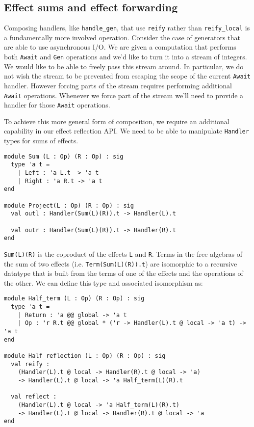 \documentclass[acmsmall, screen, nonacm]{acmart}
\theoremstyle{definition}
\begin{document}
\subsection{Effect sums and effect forwarding}

Composing handlers, like \lstinline[style=oxcaml]{handle_gen}, that use
\lstinline[style=oxcaml]{reify} rather than
\lstinline[style=oxcaml]{reify_local} is a fundamentally more involved
operation. Consider the case of generators that are able to use
asynchronous I/O. We are given a computation that performs both
\lstinline[style=oxcaml]{Await} and \lstinline[style=oxcaml]{Gen}
operations and we'd like to turn it into a stream of integers.  We would
like to be able to freely pass this stream around. In particular, we do
not wish the stream to be prevented from escaping the scope of the
current \lstinline[style=oxcaml]{Await} handler.  However forcing parts
of the stream requires performing additional
\lstinline[style=oxcaml]{Await} operations. Whenever we force part of the
stream we'll need to provide a handler for those
\lstinline[style=oxcaml]{Await} operations.

To achieve this more general form of composition, we require an
additional capability in our effect reflection API. We need to be able
to manipulate \lstinline[style=oxcaml]{Handler} types for sums of
effects.
\begin{lstlisting}[style=oxcaml]
module Sum (L : Op) (R : Op) : sig
  type 'a t =
    | Left : 'a L.t -> 'a t
    | Right : 'a R.t -> 'a t
end

module Project(L : Op) (R : Op) : sig
  val outl : Handler(Sum(L)(R)).t -> Handler(L).t

  val outr : Handler(Sum(L)(R)).t -> Handler(R).t
end
\end{lstlisting}

\lstinline[style=oxcaml]{Sum(L)(R)} is the coproduct of the effects
\lstinline[style=oxcaml]{L} and \lstinline[style=oxcaml]{R}. Terms in
the free algebras of the sum of two effects
(i.e. \lstinline[style=oxcaml]{Term(Sum(L)(R)).t}) are isomorphic to a
recursive datatype that is built from the terms of one of the effects
and the operations of the other\cite{hyland2006combining}. We can define
this type and associated isomorphism as:
\begin{lstlisting}[style=oxcaml]
module Half_term (L : Op) (R : Op) : sig
  type 'a t =
    | Return : 'a @@ global -> 'a t
    | Op : 'r R.t @@ global * ('r -> Handler(L).t @ local -> 'a t) -> 'a t
end

module Half_reflection (L : Op) (R : Op) : sig
  val reify :
    (Handler(L).t @ local -> Handler(R).t @ local -> 'a)
    -> Handler(L).t @ local -> 'a Half_term(L)(R).t

  val reflect :
    (Handler(L).t @ local -> 'a Half_term(L)(R).t)
    -> Handler(L).t @ local -> Handler(R).t @ local -> 'a
end
\end{lstlisting}
\end{document}
